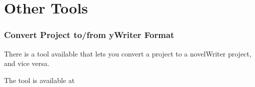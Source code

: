 \documentclass[a4paper,11pt,english]{sphinxmanual}
\begin{document}
\sphinxAtStartPar
{}


\section{Other Tools}
\label{\detokenize{int_howto:other-tools}}\subsubsection*{Convert Project to/from yWriter Format}

\sphinxAtStartPar
There is a tool available that lets you convert a 
project to a novelWriter project, and vice versa.

\sphinxAtStartPar
The tool is available at 

\sphinxstepscope
\end{document}

